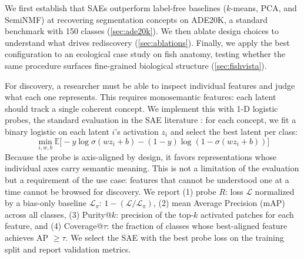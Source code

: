 \documentclass[runningheads]{llncs}
\begin{document}
We first establish that SAEs outperform label-free baselines ($k$-means, PCA, and SemiNMF) at recovering segmentation concepts on ADE20K, a standard benchmark with 150 classes (\cref{sec:ade20k}).
We then ablate design choices to understand what drives rediscovery (\cref{sec:ablations}).
Finally, we apply the best configuration to an ecological case study on fish anatomy, testing whether the same procedure surfaces fine-grained biological structure (\cref{sec:fishvista}).

For discovery, a researcher must be able to inspect individual features and judge what each one represents.
This requires monosemantic features: each latent should track a single coherent concept.
We implement this with 1-D logistic probes, the standard evaluation in the SAE literature \citep{gao2025scaling}: for each concept, we fit a binary logistic on each latent $i$'s activation $z_i$ and select the best latent per class:
\begin{equation}\label{eq:probe-loss}
    \min_{i,w,b} \mathbb{E} \big[-y \log \sigma (wz_i + b) - (1-y) \log (1 - \sigma (wz_i+b)) \big]
\end{equation}
Because the probe is axis-aligned by design, it favors representations whose individual axes carry semantic meaning.
This is not a limitation of the evaluation but a requirement of the use case: features that cannot be understood one at a time cannot be browsed for discovery.
We report (1) probe $R$: loss $\mathcal{L}$ normalized by a bias-only baseline $\mathcal{L}_\pi$: $1 - (\mathcal{L}/\mathcal{L}_\pi)$, (2) mean Average Precision (mAP) across all classes, (3) Purity@$k$: precision of the top-$k$ activated patches for each feature, and (4) Coverage@$\tau$: the fraction of classes whose best-aligned feature achieves AP $\geq \tau$.
We select the SAE with the best probe loss on the training split and report validation metrics.
\end{document}
